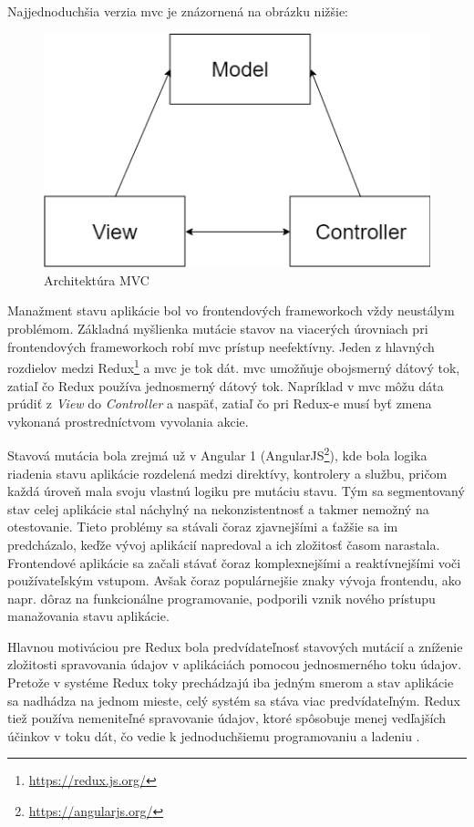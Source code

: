 \newpage
Najjednoduchšia verzia \acrshort{mvc} je znázornená na obrázku nižšie:
\begin{figure}[ht]
  \centering
  \includegraphics[width=0.6\columnwidth]{img/mvc.png}
  \caption{\label{fig:mvc} Architektúra MVC}
\end{figure}

Manažment stavu aplikácie bol vo frontendových frameworkoch vždy neustálym
problémom. Základná myšlienka mutácie stavov na viacerých úrovniach pri
frontendových frameworkoch robí \acrshort{mvc} prístup neefektívny.
Jeden z hlavných rozdielov medzi Redux\footnote{\url{https://redux.js.org/}}
a \acrshort{mvc} je tok dát. \acrshort{mvc} umožňuje obojsmerný dátový tok, zatiaľ čo Redux
používa jednosmerný dátový tok. Napríklad v \acrshort{mvc} môžu dáta prúdiť z \textit{View}
do \textit{Controller} a naspäť, zatiaľ čo pri Redux-e musí byť zmena vykonaná
prostredníctvom vyvolania akcie.

Stavová mutácia bola zrejmá už v Angular 1 (AngularJS\footnote{\url{ https://angularjs.org/}}),
kde bola logika riadenia stavu aplikácie rozdelená medzi direktívy, kontrolery a službu,
pričom každá úroveň mala svoju vlastnú logiku pre mutáciu stavu. Tým sa segmentovaný
stav celej aplikácie stal náchylný na nekonzistentnosť a takmer nemožný na otestovanie.
Tieto problémy sa stávali čoraz zjavnejšími a ťažšie sa im predcházalo, keďže vývoj
aplikácií napredoval a ich zložitosť časom narastala. Frontendové aplikácie sa začali
stávať čoraz komplexnejšími a reaktívnejšími voči používateľským vstupom. Avšak
čoraz populárnejšie znaky vývoja frontendu, ako napr. dôraz na funkcionálne
programovanie, podporili vznik nového prístupu manažovania stavu aplikácie.

Hlavnou motiváciou pre Redux bola predvídateľnosť stavových mutácií a zníženie
zložitosti spravovania údajov v aplikáciách pomocou jednosmerného toku údajov.
Pretože v systéme Redux toky prechádzajú iba jedným smerom a stav aplikácie
sa nadhádza na jednom mieste, celý systém sa stáva viac predvídateľným.
Redux tiež používa nemeniteľné spravovanie údajov, ktoré spôsobuje menej
vedľajších účinkov v toku dát, čo vedie k jednoduchšiemu programovaniu a ladeniu \cite{piispanen}.

